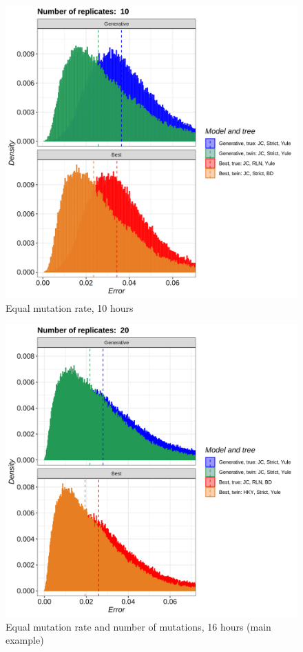 \begin{figure}[H]
  \includegraphics[width=\textwidth]{pirouette_example_18/errors.png}
  \caption{Equal mutation rate, 10 hours}
\end{figure}

\begin{figure}[H]
  \includegraphics[width=\textwidth]{pirouette_example_28/errors.png}
  \caption{Equal mutation rate and number of mutations, 16 hours (main example)}
\end{figure}

